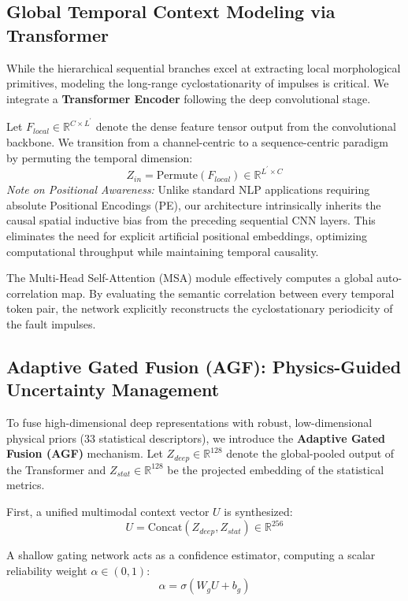 \documentclass[5p,times,twocolumn]{elsarticle}
\begin{document}
\subsection{Global Temporal Context Modeling via Transformer}
While the hierarchical sequential branches excel at extracting local morphological primitives, modeling the long-range cyclostationarity of impulses is critical. We integrate a \textbf{Transformer Encoder} following the deep convolutional stage.

Let $F_{local} \in \mathbb{R}^{C \times L^{\prime}}$ denote the dense feature tensor output from the convolutional backbone. We transition from a channel-centric to a sequence-centric paradigm by permuting the temporal dimension:
\begin{equation}
Z_{in} = \text{Permute}(F_{local}) \in \mathbb{R}^{L^{\prime} \times C}
\end{equation}
\textit{Note on Positional Awareness:} Unlike standard NLP applications requiring absolute Positional Encodings (PE), our architecture intrinsically inherits the causal spatial inductive bias from the preceding sequential CNN layers. This eliminates the need for explicit artificial positional embeddings, optimizing computational throughput while maintaining temporal causality.

The Multi-Head Self-Attention (MSA) module effectively computes a global auto-correlation map. By evaluating the semantic correlation between every temporal token pair, the network explicitly reconstructs the cyclostationary periodicity of the fault impulses.

\subsection{Adaptive Gated Fusion (AGF): Physics-Guided Uncertainty Management}
To fuse high-dimensional deep representations with robust, low-dimensional physical priors (33 statistical descriptors), we introduce the \textbf{Adaptive Gated Fusion (AGF)} mechanism. Let $Z_{deep} \in \mathbb{R}^{128}$ denote the global-pooled output of the Transformer and $Z_{stat} \in \mathbb{R}^{128}$ be the projected embedding of the statistical metrics. 

First, a unified multimodal context vector $U$ is synthesized:
\begin{equation}
U = \text{Concat}(Z_{deep}, Z_{stat}) \in \mathbb{R}^{256}
\end{equation}

A shallow gating network acts as a confidence estimator, computing a scalar reliability weight $\alpha \in (0,1)$:
\begin{equation}
\alpha = \sigma(W_{g} U + b_{g})
\end{equation}
\end{document}
